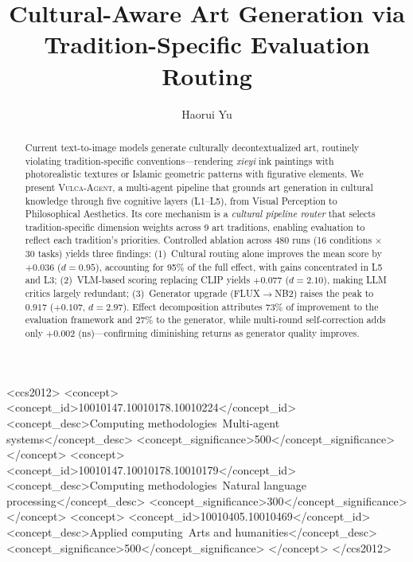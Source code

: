 \documentclass[sigconf, screen, review, anonymous]{acmart}
\newcommand{\system}{\textsc{Vulca-Agent}}
\newcommand{\Lx}[1]{L#1}
\begin{document}
\title{Cultural-Aware Art Generation via Tradition-Specific Evaluation Routing}

\author{Haorui Yu}

\begin{CCSXML}
<ccs2012>
  <concept>
    <concept_id>10010147.10010178.10010224</concept_id>
    <concept_desc>Computing methodologies~Multi-agent systems</concept_desc>
    <concept_significance>500</concept_significance>
  </concept>
  <concept>
    <concept_id>10010147.10010178.10010179</concept_id>
    <concept_desc>Computing methodologies~Natural language processing</concept_desc>
    <concept_significance>300</concept_significance>
  </concept>
  <concept>
    <concept_id>10010405.10010469</concept_id>
    <concept_desc>Applied computing~Arts and humanities</concept_desc>
    <concept_significance>500</concept_significance>
  </concept>
</ccs2012>
\end{CCSXML}



\begin{abstract}

Current text-to-image models generate culturally decontextualized art, routinely violating tradition-specific conventions---rendering \emph{xieyi} ink paintings with photorealistic textures or Islamic geometric patterns with figurative elements.
We present \system{}, a multi-agent pipeline that grounds art generation in cultural knowledge through five cognitive layers (\Lx{1}--\Lx{5}), from Visual Perception to Philosophical Aesthetics.
Its core mechanism is a \emph{cultural pipeline router} that selects tradition-specific dimension weights across 9 art traditions, enabling evaluation to reflect each tradition's priorities.
Controlled ablation across 480 runs (16 conditions $\times$ 30 tasks) yields three findings:
(1)~Cultural routing alone improves the mean score by $+0.036$ ($d = 0.95$), accounting for 95\% of the full effect, with gains concentrated in \Lx{5} and \Lx{3};
(2)~VLM-based scoring replacing CLIP yields $+0.077$ ($d = 2.10$), making LLM critics largely redundant;
(3)~Generator upgrade (FLUX$\to$NB2) raises the peak to $\mathbf{0.917}$ ($+0.107$, $d = 2.97$).
Effect decomposition attributes 73\% of improvement to the evaluation framework and 27\% to the generator, while multi-round self-correction adds only $+0.002$ (ns)---confirming diminishing returns as generator quality improves.

\end{abstract}
\end{document}
